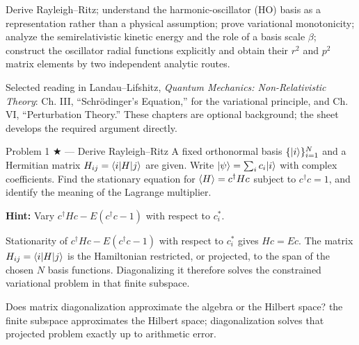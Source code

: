 \documentclass[11pt]{article}
\begin{document}

\begin{goals}
Derive Rayleigh--Ritz; understand the harmonic-oscillator (HO) basis as a
representation rather than a physical assumption; prove variational monotonicity;
analyze the semirelativistic kinetic energy and the role of a basis scale $\beta$;
construct the oscillator radial functions explicitly and obtain their $r^2$ and
$p^2$ matrix elements by two independent analytic routes.
\end{goals}
\begin{reading}
Selected reading in Landau--Lifshitz, \emph{Quantum Mechanics: Non-Relativistic
Theory}: Ch. III, ``Schr\"odinger's Equation,'' for the variational principle,
and Ch. VI, ``Perturbation Theory.'' These chapters are optional background;
the sheet develops the required argument directly.
\end{reading}


\begin{problem}{Problem 1 ★ — Derive Rayleigh--Ritz}
A fixed orthonormal basis $\{\lvert i\rangle\}_{i=1}^N$ and a Hermitian matrix
$H_{ij}=\langle i\rvert H\lvert j\rangle$ are given. Write $\lvert \psi\rangle=\sum_i c_i\lvert i\rangle$
with complex coefficients. Find the stationary equation for
$\left\langle H\right\rangle=c^\dagger Hc$ subject to $c^\dagger c=1$,
and identify the meaning of the Lagrange multiplier.

\textbf{Hint:} Vary $c^\dagger Hc-E(c^\dagger c-1)$ with respect to $c_i^*$.
\end{problem}
\begin{solution}
Stationarity of $c^\dagger Hc-E(c^\dagger c-1)$ with respect to $c_i^*$ gives
$Hc=Ec$. The matrix $H_{ij}=\langle i\rvert H\lvert j\rangle$ is the Hamiltonian restricted, or
projected, to the span of the chosen $N$ basis functions. Diagonalizing it
therefore solves the constrained variational problem in that finite subspace.
\end{solution}
\begin{quiz}
Does matrix diagonalization approximate the algebra or the Hilbert space?
\answer the finite subspace approximates the Hilbert space; diagonalization
solves that projected problem exactly up to arithmetic error.
\end{quiz}
\end{document}
